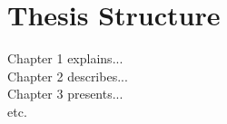 \section{Thesis Structure}
Chapter 1 explains... \\
Chapter 2 describes... \\
Chapter 3 presents... \\
etc.
	
